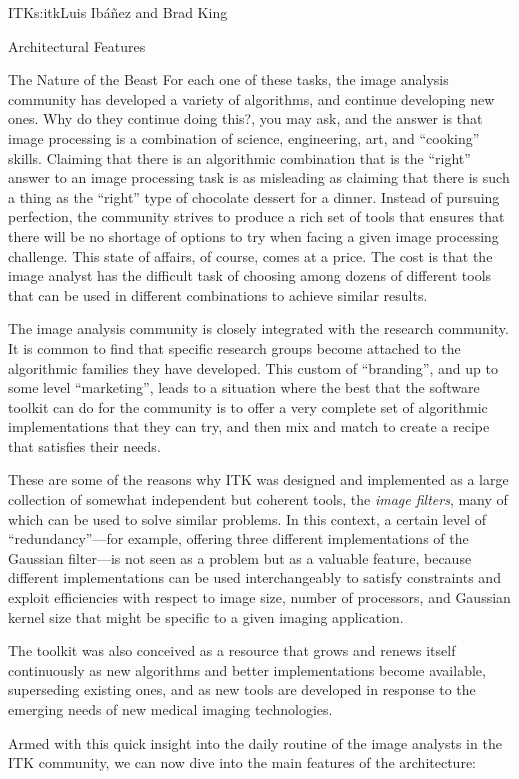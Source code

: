 \begin{aosachapter}{ITK}{s:itk}{Luis Ib\'{a}\~{n}ez and Brad King}
\begin{aosasect1}{Architectural Features}
\begin{aosasect2}{The Nature of the Beast}
For each one of these tasks, the image analysis community has developed a
variety of algorithms, and continue developing new ones. Why do they
continue doing this?, you may ask, and the answer is that image processing is
a combination of science, engineering, art, and ``cooking'' skills. Claiming
that there is an algorithmic combination that is the ``right'' answer to an
image processing task is as misleading as claiming that there is such a thing as
the ``right'' type of chocolate dessert for a dinner. Instead of pursuing
perfection, the community strives to produce a rich set of tools that
ensures that there will be no shortage of options to try when 
facing a given image processing challenge. This state of
affairs, of course, comes at a price. The cost is that the image
analyst has the difficult task of choosing among dozens of different
tools that can be used in different combinations to achieve similar
results.

The image analysis community is closely integrated with the research
community. It is common to find that specific research groups become attached
to the algorithmic families they have developed. This custom of ``branding'',
and up to some level ``marketing'', leads to a situation where the best that the
software toolkit can do for the community is to offer a very complete set of
algorithmic implementations that they can try, and then mix and match to create
a recipe that satisfies their needs.

These are some of the reasons why ITK was designed and implemented as a large
collection of somewhat independent but coherent tools, the \emph{image filters}, many
of which can be used to solve similar problems. In this context, a certain
level of ``redundancy''---for example, offering three different implementations of
the Gaussian filter---is not seen as a problem but as a valuable feature,
because different implementations can be used interchangeably to satisfy constraints and exploit
efficiencies with respect to image size, number of processors,
and Gaussian kernel size that might be specific to a given imaging application.

The toolkit was also conceived as a resource that grows and renews itself
continuously as new algorithms and better implementations become available,
superseding existing ones, and as new tools are developed in response to the
emerging needs of new medical imaging technologies.

Armed with this quick insight into the daily
routine of the image analysts in the ITK community, we can now dive
into the main features of the architecture:


\end{aosasect2}
\end{aosasect1}
\end{aosachapter}
